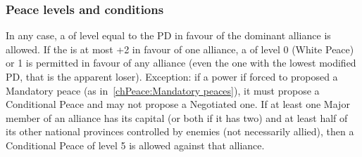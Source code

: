 \subsubsection{Peace levels and conditions}
\bparag In any case, a  of level equal to the PD in
favour of the dominant alliance is
allowed. %
\bparag If the  is at most +2 in favour of one
alliance, a  of level 0 (White Peace) or 1 is
permitted in favour of any alliance (even the one with the lowest modified PD,
that is the apparent loser).
\bparag Exception: if a power if forced to proposed a Mandatory peace (as
in~\ref{chPeace:Mandatory peaces}), it must propose a Conditional Peace and
may not propose a Negotiated one.
\bparag If at least one Major member of an alliance has its capital (or both
if it has two) and at least half of its other national provinces controlled by
enemies (not necessarily allied), then a Conditional Peace of level 5 is
allowed against that alliance.

